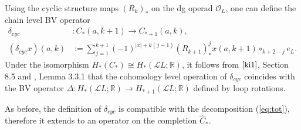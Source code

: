 \documentclass[a4paper]{article}
\numberwithin{equation}{section}
\begin{document}
Using the cyclic structure maps $(R_k)_\ast$ on the dg operad $\mathcal{O}_L$, one can define the chain level BV operator
\begin{equation}\label{eq:BV-c}
\begin{split}
\delta_\mathit{cyc}&:C_\ast(a,k+1)\rightarrow C_{\ast+1}(a,k), \\
(\delta_\mathit{cyc} x)(a,k)&:=\sum_{j=1}^{k+1}(-1)^{|x|+k(j-1)}(R_{k+1})_\ast^jx(a,k+1)\circ_{k+2-j}e_L.
\end{split}
\end{equation}
Under the isomorphism $H_\ast(C_\ast)\cong H_\ast(\mathcal{L}L;\mathbb{R})$, it follows from $\cite{ki1}$, Section 8.5 and \cite{ywt}, Lemma 3.3.1 that the cohomology level operation of $\delta_\mathit{cyc}$ coincides with the BV operator $\Delta:H_\ast(\mathcal{L}L;\mathbb{R})\rightarrow H_{\ast+1}(\mathcal{L}L;\mathbb{R})$ defined by loop rotations.

As before, the definition of $\delta_\mathit{cyc}$ is compatible with the decomposition (\ref{eq:tot}), therefore it extends to an operator on the completion $\widehat{C}_\ast$. 
\end{document}
